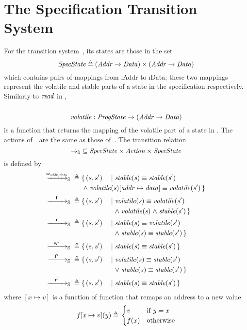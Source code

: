 
\section{The Specification Transition System~\Spec}
\label{sec:Spec}

For the transition system~\Spec, its states are those in the set
$$ \mathit{SpecState} {}\triangleq{} (\mathit{Addr} \to \mathit{Data}) \times (\mathit{Addr} \to \mathit{Data}) $$
which contains pairs of mappings from \i{Addr} to \i{Data}; these two mappings represent the volatile and stable parts of a state in the specification respectively. Similarly to $\mathit{read}$ in \Prog, \\
\
$$ \mathit{volatile}: \mathit{ProgState} \to (\mathit{Addr} \to \mathit{Data}) $$
is a function that returns the mapping of the volatile part of a state in \Spec .
The actions of~\Spec\ are the same as those of~\Prog.
The transition relation
$$ {\xrightarrow{}_{\mathbb S}} \subseteq \mathit{SpecState} \times \mathit{Action} \times \mathit{SpecState} $$
is defined by
\begin{alignat*}{3}
	\ttS{\awa{ww}{\actw_{\i{addr}, \i{data}}}} \defeq{}& \{\, (s, s')&& \mid \i{stable(s)} \equiv \i{stable(s')} \\
	& \omit \span \span \conj \i{volatile(s)[addr \mapsto data]} \equiv \i{volatile(s')} \,\} \\
	\ttS{\awa{ww}\actf} \defeq{}& \{\, (s, s')&& \mid \i{volatile(s)} \equiv \i{volatile(s')}\\
	& \quad && \hmid \conj \i{volatile(s)} \conj \i{stable(s')} \,\} \\
	\ttS{\awa{ww}\actr} \defeq{}& \{\, (s, s')&& \mid \i{stable(s)} \equiv \i{volatile(s')}\\
	& \quad && \hmid \conj \i{stable(s)} \equiv \i{stable(s')} \,\} \\
	\ttS{\awa{ww}\actwc} \defeq{}& \{\, (s, s')&& \mid \i{stable(s)} \equiv \i{stable(s')} \,\} \\
	\ttS{\awa{ww}\actfc} \defeq{}& \{\, (s, s')&& \mid \i{volatile(s)} \equiv \i{stable(s')} \\
	& \quad && \hmid \disj \i{stable(s)} \equiv \i{stable(s')} \,\} \\
	\ttS{\awa{ww}\actrc} \defeq{}& \{\, (s, s')&& \mid \i{stable(s)} \equiv \i{stable(s')} \,\}
\end{alignat*}
where $[x \mapsto v]$ is a function of function that remaps an address to a new value
$$f[x \mapsto v](y) {}\triangleq{} \begin{cases} v & \text{if } y = x \\ f(x) & \text{otherwise} \end{cases} $$
